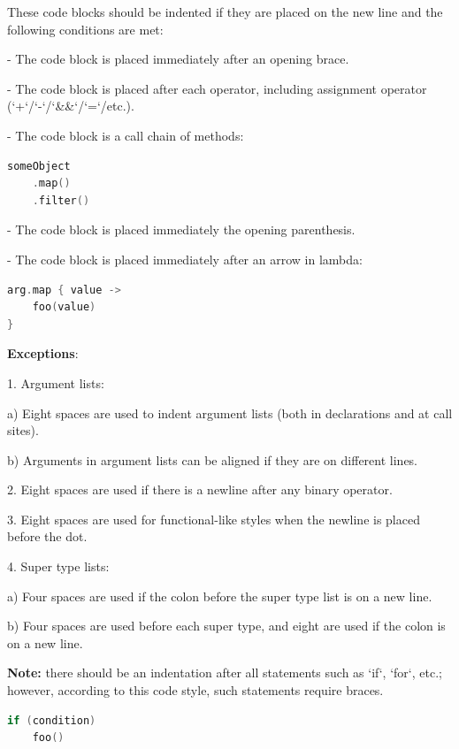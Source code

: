 These code blocks should be indented if they are placed on the new line and the following conditions are met:

-	The code block is placed immediately after an opening brace.

-	The code block is placed after each operator, including assignment operator (`+`/`-`/`\&\&`/`=`/etc.).

-	The code block is a call chain of methods:

\begin{lstlisting}[language=Kotlin]
someObject
    .map()
    .filter()
\end{lstlisting}
-  The code block is placed immediately the opening parenthesis.

-  The code block is placed immediately after an arrow in lambda:



\begin{lstlisting}[language=Kotlin]
arg.map { value ->
    foo(value)
}
\end{lstlisting}
    

\textbf{Exceptions}:

1.	Argument lists: \

a) Eight spaces are used to indent argument lists (both in declarations and at call sites). \

b) Arguments in argument lists can be aligned if they are on different lines. 



2.	Eight spaces are used if there is a newline after any binary operator.



3.	Eight spaces are used for functional-like styles when the newline is placed before the dot.



4.	Super type lists: \

a) Four spaces are used if the colon before the super type list is on a new line. \

b) Four spaces are used before each super type, and eight are used if the colon is on a new line. 



\textbf{Note:} there should be an indentation after all statements such as `if`, `for`, etc.; however, according to this code style, such statements require braces. 



\begin{lstlisting}[language=Kotlin]
if (condition)
    foo()
\end{lstlisting}


